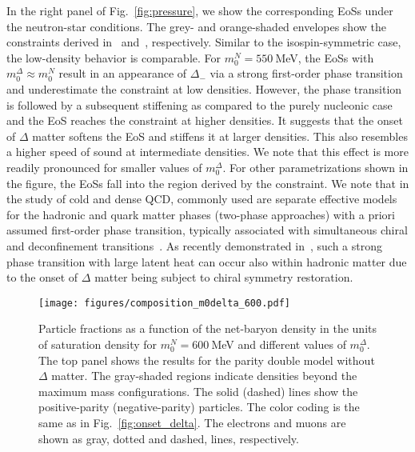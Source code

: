 \documentclass[preprint,showkeys,lengthcheck,nofootinbib,twocolumn,notitlepage,floatfix,superscriptaddress]{revtex4-1}
\begin{document}
In the right panel of Fig.~\ref{fig:pressure}, we show the corresponding EoSs under the neutron-star conditions. The grey- and orange-shaded envelopes show the constraints derived in~\cite{Abbott:2018exr} and~\cite{Annala:2019puf}, respectively. Similar to the isospin-symmetric case, the low-density behavior is comparable. For $m_0^N=550~$MeV, the EoSs with $m_0^\Delta \approx m_0^N$ result in an appearance of $\Delta_-$ via a strong first-order phase transition and underestimate the constraint at low densities. However, the phase transition is followed by a subsequent stiffening as compared to the purely nucleonic case and the EoS reaches the constraint at higher densities. It suggests that the onset of $\Delta$ matter softens the EoS and stiffens it at larger densities. This also resembles a higher speed of sound at intermediate densities. We note that this effect is more readily pronounced for smaller values of $m_0^\Delta$. For other parametrizations shown in the figure, the EoSs fall into the region derived by the constraint. We note that in the study of cold and dense QCD, commonly used are separate effective models for the hadronic and quark matter phases (two-phase approaches) with a priori assumed first-order phase transition, typically associated with simultaneous chiral and deconfinement transitions~\cite{Alvarez-Castillo:2016wqj}. As recently demonstrated in~\cite{Marczenko:2021uaj}, such a strong phase transition with large latent heat can occur also within hadronic matter due to the onset of $\Delta$ matter being subject to chiral symmetry restoration.

\begin{figure}[t!]
  \centering
  \texttt{[image: figures/composition\_m0delta\_600.pdf]}
  \caption{Particle fractions as a function of the net-baryon density in the units of saturation density for $m_0^N=600~$MeV and different values of $m_0^\Delta$. The top panel shows the results for the parity double model without $\Delta$ matter. The gray-shaded regions indicate densities beyond the maximum mass configurations. The solid (dashed) lines show the positive-parity (negative-parity) particles. The color coding is the same as in Fig.~\ref{fig:onset_delta}. The electrons and muons are shown as gray, dotted and dashed, lines, respectively.}
  \label{fig:composition}
\end{figure}



\end{document}
